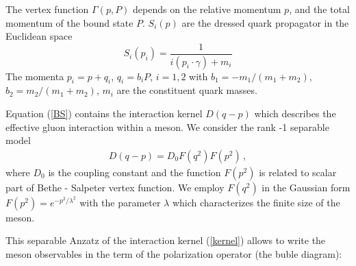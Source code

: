 \documentclass[%
]{ittmm}
\begin{document}
The vertex function $\Gamma (p,P)$ depends on the relative
momentum $p$, and the total momentum of the bound state $P$. 
$S_i(p)$ are the dressed quark propagator in the Euclidean space 
\begin{equation}\label{Eqn:q_prop}
S_i(p_i)=\frac{1}{i (p_i\cdot \gamma) + m_i}
\end{equation}
The momenta $p_i=p+q_i$, $q_i = b_i P$, $i=1,2$ with 
$b_1 =- m_1/(m_1+m_2)$, $b_2 = m_2/(m_1+m_2)$, $m_i$ are the constituent quark masses. 

Equation (\ref{BS}) contains the interaction kernel $D(q-p)$ 
which describes the effective gluon interaction within a meson. 
We consider the rank -1 separable  model 
\begin{eqnarray}\label{kernel}
  D(q-p) = D_0 F(q^2) F(p^2) \, ,
\end{eqnarray}
where $D_0$ is the coupling constant and the function 
$F(p^2)$ is related to scalar part of Bethe - Salpeter  vertex
function. We employ  $F(q^2)$  in the Gaussian form 
$F(p^2)= e^{-p^2/\lambda^2}$ with the parameter $\lambda$ which  characterizes the finite size of the meson. 

This separable Anzatz of the interaction kernel (\ref{kernel}) allows to write the meson observables in the term of the polarization operator (the buble diagram): 


\end{document}
